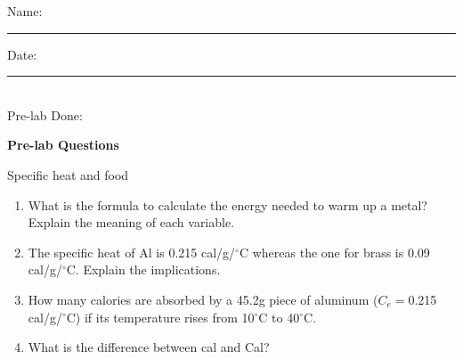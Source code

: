 \documentclass[main.tex]{subfiles}
\begin{document}
\newpage
\setdoublesep{0.35700 em}  %
\setatomsep{1.78500 em}    %
\setbondoffset{0.18265 em} %
\newcommand{\bondwidth}{0.06642 em} %
\setbondstyle{line width = \bondwidth}

\begin{fullwidth}





\begin{multicols}{2}
\begin{tcolorbox}[enhanced jigsaw,breakable,size=title,
colback=mybrown!05,colframe=black,fonttitle=\bfseries,
title=STUDENT INFO,pad at break=1mm, break at=15cm/0pt ]
\vspace{0.2cm}
\noindent Name: \rule{5cm}{0.4pt}Date:\rule{1cm}{0.4pt}\\
Pre-lab Done: \quad
\end{tcolorbox}
\end{multicols}
\hfill
\vspace{0.2cm}
\begin{center}
{\large \bfseries 
Pre-lab Questions 
\par
\Huge
Specific heat and food
\\[5pt] \par}
\vspace{0.2cm}
\end{center}
\par
\noindent
\uline{  \hfill \normalsize \hfill       }

\begin{enumerate}
\item What is the formula to calculate the energy needed to warm up a metal? Explain the meaning of each variable.
\vspace{3cm}


\item The specific heat of Al is 0.215 cal/g/$^\circ$C whereas the one for brass is 0.09 cal/g/$^\circ$C. Explain the implications.
\vspace{3cm}

\item How many calories are absorbed by a 45.2g piece of aluminum ($C_e=$0.215 cal/g/$^\circ$C)
if its temperature rises from 10$^\circ$C to 40$^\circ$C.
\vspace{3cm}

\item What is the difference between cal and Cal?
\vspace{3cm}


\end{enumerate}
\end{fullwidth}
\end{document}
